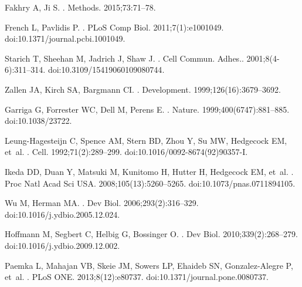\documentclass[10pt,letterpaper]{article}
\begin{document}
{\begin{thebibliography}{100}
Fakhry A, Ji S.
.
\newblock Methods. 2015;73:71--78.

French L, Pavlidis P.
.
\newblock PLoS Comp Biol. 2011;7(1):e1001049.
\newblock doi:{10.1371/journal.pcbi.1001049}.

Starich T, Sheehan M, Jadrich J, Shaw J.
.
\newblock Cell Commun. Adhes.. 2001;8(4-6):311--314.
\newblock doi:{10.3109/15419060109080744}.

Zallen JA, Kirch SA, Bargmann CI.
.
\newblock Development. 1999;126(16):3679--3692.

Garriga G, Forrester WC, Dell M, Perens E.
.
\newblock Nature. 1999;400(6747):881--885.
\newblock doi:{10.1038/23722}.

Leung-Hagesteijn C, Spence AM, Stern BD, Zhou Y, Su MW, Hedgecock EM, et~al.
.
\newblock Cell. 1992;71(2):289--299.
\newblock doi:{10.1016/0092-8674(92)90357-I}.

Ikeda DD, Duan Y, Matsuki M, Kunitomo H, Hutter H, Hedgecock EM, et~al.
.
\newblock Proc Natl Acad Sci USA. 2008;105(13):5260--5265.
\newblock doi:{10.1073/pnas.0711894105}.

Wu M, Herman MA.
.
\newblock Dev Biol. 2006;293(2):316--329.
\newblock doi:{10.1016/j.ydbio.2005.12.024}.

Hoffmann M, Segbert C, Helbig G, Bossinger O.
.
\newblock Dev Biol. 2010;339(2):268--279.
\newblock doi:{10.1016/j.ydbio.2009.12.002}.

Paemka L, Mahajan VB, Skeie JM, Sowers LP, Ehaideb SN, Gonzalez-Alegre P,
  et~al.
.
\newblock PLoS ONE. 2013;8(12):e80737.
\newblock doi:{10.1371/journal.pone.0080737}.


\end{thebibliography}}
\end{document}
